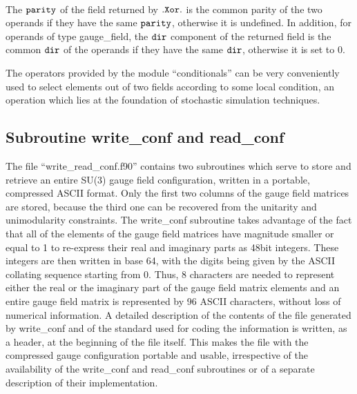 \vskip 4mm
{\baselineskip 5mm \tt
{}
}        

The $\tt parity$ of the field returned by $\tt .Xor.$ is the common
parity of the two operands if they have the same $\tt parity$,
otherwise it is undefined.  In addition, for operands of type
gauge\_field, the $\tt dir$ component of the returned field is the
common $\tt dir $ of the operands if they have the same $\tt dir$,
otherwise it is set to 0.

The operators provided by the module ``conditionals'' can be very 
conveniently used to select elements out of two fields according
to some local condition, an operation which lies at the foundation
of stochastic simulation techniques. 

\subsection{Subroutine write\_conf and read\_conf}
\label{wrconf}

The file ``write\_read\_conf.f90'' contains two subroutines which
serve to store and retrieve an entire SU(3) gauge field configuration,
written in a portable, compressed ASCII format.  Only the first two 
columns of the gauge field matrices are stored, because
the third one can be recovered from the unitarity and unimodularity
constraints.  The write\_conf subroutine takes advantage of the fact
that all of the elements of the gauge field matrices have magnitude
smaller or equal to 1 to re-express their real and imaginary parts 
as 48bit integers.  These integers are then written in base 64,
with the digits being given by the ASCII collating sequence
starting from 0.  Thus, 8 characters are needed to represent either
the real or the imaginary part of the gauge field matrix elements
and an entire gauge field matrix is represented by 96 ASCII characters,
without loss of numerical information.  A detailed description of
the contents of the file generated by write\_conf and of the 
standard used for coding the information is written, as a header,
at the beginning of the file itself.  This makes the file with
the compressed gauge configuration portable and usable, irrespective
of the availability of the write\_conf and read\_conf subroutines or
of a separate description of their implementation.

